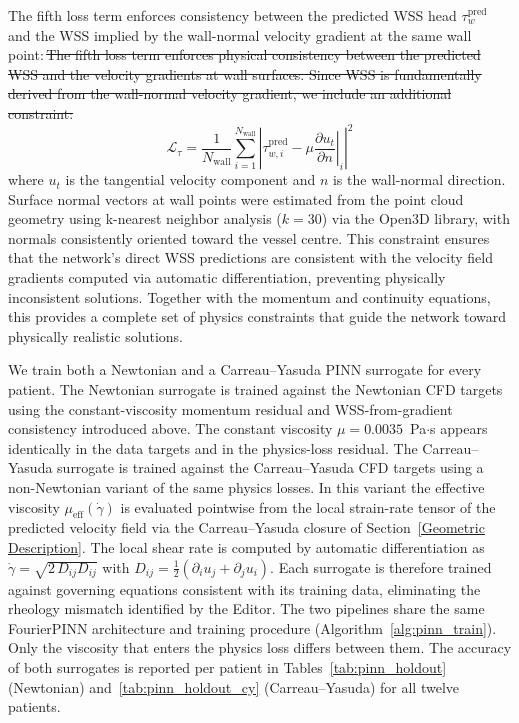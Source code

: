 ﻿\documentclass[12pt,a4paper]{article}
\newcommand{\added}[2][]{\begingroup\color{red}#2\endgroup}
\newcommand{\deleted}[2][]{\begingroup\color{red}\sout{#2}\endgroup}
\newcommand{\replaced}[3][]{\added{#2}\,\deleted{#3}}
\newcommand{\addp}[1]{\added{#1}}
\theoremstyle{definition}
\numberwithin{equation}{section}
\begin{document}
{\replaced[id=pinn]{The fifth loss term enforces consistency between the predicted WSS head $\tau_w^{\text{pred}}$ and the WSS implied by the wall-normal velocity gradient at the same wall point:}{The fifth loss term enforces physical consistency between the predicted WSS and the velocity gradients at wall surfaces. Since WSS is fundamentally derived from the wall-normal velocity gradient, we include an additional constraint:}
{\begin{equation}
    \mathcal{L}_{\tau} = \frac{1}{N_{\text{wall}}} \sum_{i=1}^{N_{\text{wall}}} \left| \tau_{w,i}^{\text{pred}} - \mu \left. \frac{\partial u_t}{\partial n} \right|_i \right|^2
\end{equation}}
{where $u_t$ is the tangential velocity component and $n$ is the wall-normal direction. Surface normal vectors at wall points were estimated from the point cloud geometry using k-nearest neighbor analysis ($k=30$) via the Open3D library, with normals consistently oriented toward the vessel centre. This constraint ensures that the network's direct WSS predictions are consistent with the velocity field gradients computed via automatic differentiation, preventing physically inconsistent solutions. Together with the momentum and continuity equations, this provides a complete set of physics constraints that guide the network toward physically realistic solutions.}

\addp{We train both a Newtonian and a Carreau--Yasuda PINN surrogate for every patient. The Newtonian surrogate is trained against the Newtonian CFD targets using the constant-viscosity momentum residual and WSS-from-gradient consistency introduced above. The constant viscosity $\mu = 0.0035$~Pa$\cdot$s appears identically in the data targets and in the physics-loss residual. The Carreau--Yasuda surrogate is trained against the Carreau--Yasuda CFD targets using a non-Newtonian variant of the same physics losses. In this variant the effective viscosity $\mu_{\mathrm{eff}}(\dot\gamma)$ is evaluated pointwise from the local strain-rate tensor of the predicted velocity field via the Carreau--Yasuda closure of Section~\ref{Geometric Description}. The local shear rate is computed by automatic differentiation as $\dot\gamma = \sqrt{2\,D_{ij}D_{ij}}$ with $D_{ij}=\tfrac{1}{2}(\partial_i u_j+\partial_j u_i)$. Each surrogate is therefore trained against governing equations consistent with its training data, eliminating the rheology mismatch identified by the Editor. The two pipelines share the same FourierPINN architecture and training procedure (Algorithm~\ref{alg:pinn_train}). Only the viscosity that enters the physics loss differs between them. The accuracy of both surrogates is reported per patient in Tables~\ref{tab:pinn_holdout} (Newtonian) and~\ref{tab:pinn_holdout_cy} (Carreau--Yasuda) for all twelve patients.}

}
\end{document}
